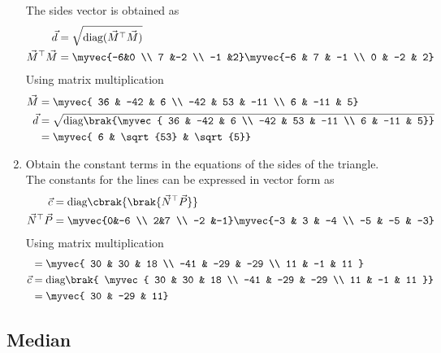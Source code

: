 \documentclass[11pt]{book}
\begin{document}
\begin{enumerate}[label=\thesubsection.\arabic*.,ref=\thesubsection.\theenumi]
\solution The sides vector is obtained as
\begin{align}
   \vec{d} &= \sqrt{\text{diag}(\vec{M}^{\top}\vec{M})}\\
   \vec{M}^{\top}\vec{M} &= \myvec{-6&0 \\ 7 &-2 \\ -1 &2}\myvec{-6 & 7 & -1 \\ 0 & -2 & 2}
\end{align} 
Using matrix multiplication 
\begin{align}
    \vec{M} &= \myvec{ 36 & -42 & 6 \\ -42 & 53 & -11 \\ 6 & -11 & 5} \\
    \vec{d} &= \sqrt{\text{diag}\brak{\myvec{ 36 & -42 & 6 \\ -42 & 53 & -11 \\ 6 & -11 & 5}}} \\
    &= \myvec{ 6 & \sqrt{53} & \sqrt{5}}
\end{align}

\item Obtain the constant terms in the equations of the sides of the triangle. \\
\solution The constants for the lines can be expressed in vector form as
\begin{align}
   \vec{c} &= \text{diag}\cbrak{\brak{\vec{N}^{\top}\vec{P}}}  \\
   \vec{N}^{\top}\vec{P} &= \myvec{0&-6 \\ 2&7 \\ -2 &-1}\myvec{-3 & 3 & -4 \\ -5 & -5 & -3} \\
\end{align}
Using matrix multiplication
\begin{align}
    &=\myvec{ 30 & 30 & 18 \\ -41 & -29 & -29 \\ 11 & -1 & 11 } \\
    \vec{c} &= \text{diag}\brak{ \myvec{ 30 & 30 & 18 \\ -41 & -29 & -29 \\ 11 & -1 & 11 }} \\
    &= \myvec{ 30 & -29 & 11}
\end{align}
\end{enumerate}


\subsection{Median}
\end{document}
